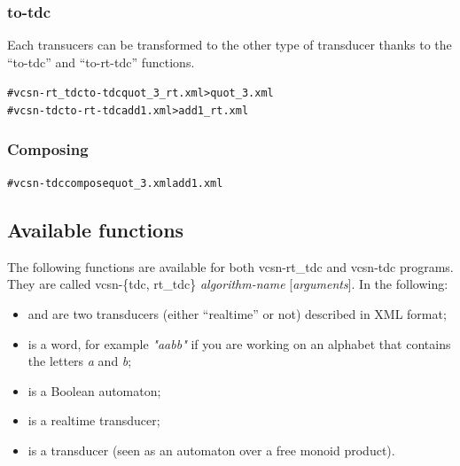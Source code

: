 \subsubsection{to-tdc}
Each transucers can be transformed to the other type of transducer
thanks to the ``to-tdc'' and ``to-rt-tdc'' functions.
\begin{alltt}
# vcsn-rt_tdc to-tdc quot_3_rt.xml > quot_3.xml
# vcsn-tdc to-rt-tdc add1.xml > add1_rt.xml
\end{alltt}

\subsubsection{Composing}
\begin{alltt}
# vcsn-tdc compose quot_3.xml add1.xml
\end{alltt}

\subsection{Available functions}
The following functions are available for both vcsn-rt\_tdc and
vcsn-tdc programs. They are called vcsn-\{tdc, rt\_tdc\}
\textit{algorithm-name} [\textit{arguments}].  In the following:

\begin{itemize}
\item {} and  are two transducers
  (either ``realtime'' or not) described in \Vauc XML format;
\item {} is a word, for example \textit{"aabb"} if you are
  working on an alphabet that contains the letters \textit{a} and \textit{b};
\item {} is a Boolean automaton;
\item {} is a realtime transducer;
\item {} is a transducer (seen as an automaton over
  a free monoid product).
\end{itemize}

